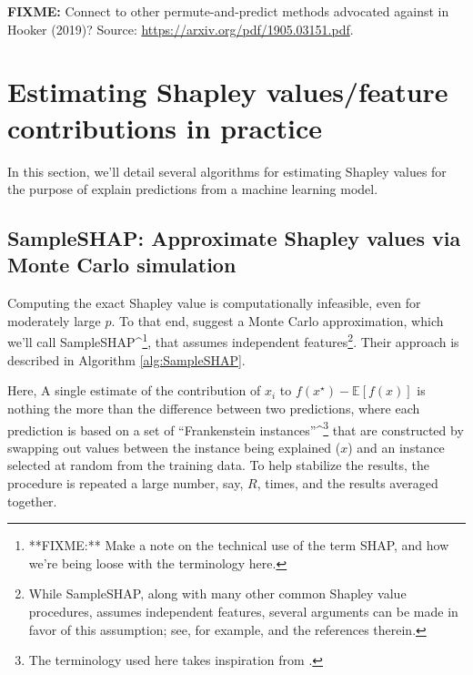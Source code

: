 \textbf{FIXME:} Connect to other permute-and-predict methods advocated
against in Hooker (2019)? Source:
\url{https://arxiv.org/pdf/1905.03151.pdf}.

\section{Estimating Shapley values/feature contributions in practice}

In this section, we'll detail several algorithms for estimating Shapley
values for the purpose of explain predictions from a machine learning
model.

\subsection{SampleSHAP: Approximate Shapley values via Monte Carlo simulation \label{sec:SampleSHAP}}

Computing the exact Shapley value is computationally infeasible, even
for moderately large \(p\). To that end,
\citet{strumbelj-2014-explaining} suggest a Monte Carlo approximation,
which we'll call
SampleSHAP\^{}\footnote{**FIXME:** Make a note on the technical use of the term SHAP, and how we're being loose with the terminology here.},
that assumes independent
features\footnote{While SampleSHAP, along with many other common Shapley value procedures, assumes independent features, several arguments can be made in favor of this assumption; see, for example, \citet{chen-2020-true} and the references therein.}.
Their approach is described in Algorithm \ref{alg:SampleSHAP}.

Here, A single estimate of the contribution of \(x_i\) to
\(f\left(x^\star\right) - \mathbb{E}\left[f\left(x\right)\right]\) is
nothing the more than the difference between two predictions, where each
prediction is based on a set of ``Frankenstein
instances''\^{}\footnote{The terminology used here takes inspiration from \citet[p. 231]{molnar-2019-iml}.}
that are constructed by swapping out values between the instance being
explained (\(x\)) and an instance selected at random from the training
data. To help stabilize the results, the procedure is repeated a large
number, say, \(R\), times, and the results averaged together.

